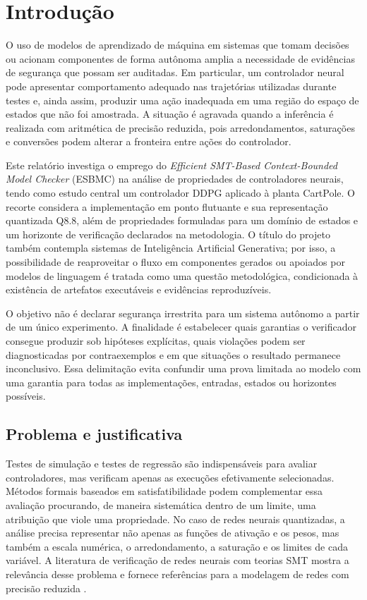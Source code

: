\chapter{Introdução}

O uso de modelos de aprendizado de máquina em sistemas que tomam decisões ou acionam componentes de forma autônoma amplia a necessidade de evidências de segurança que possam ser auditadas. Em particular, um controlador neural pode apresentar comportamento adequado nas trajetórias utilizadas durante testes e, ainda assim, produzir uma ação inadequada em uma região do espaço de estados que não foi amostrada. A situação é agravada quando a inferência é realizada com aritmética de precisão reduzida, pois arredondamentos, saturações e conversões podem alterar a fronteira entre ações do controlador.

Este relatório investiga o emprego do \textit{Efficient SMT-Based Context-Bounded Model Checker} (ESBMC) na análise de propriedades de controladores neurais, tendo como estudo central um controlador DDPG aplicado à planta CartPole. O recorte considera a implementação em ponto flutuante e sua representação quantizada Q8.8, além de propriedades formuladas para um domínio de estados e um horizonte de verificação declarados na metodologia. O título do projeto também contempla sistemas de Inteligência Artificial Generativa; por isso, a possibilidade de reaproveitar o fluxo em componentes gerados ou apoiados por modelos de linguagem é tratada como uma questão metodológica, condicionada à existência de artefatos executáveis e evidências reproduzíveis.

O objetivo não é declarar segurança irrestrita para um sistema autônomo a partir de um único experimento. A finalidade é estabelecer quais garantias o verificador consegue produzir sob hipóteses explícitas, quais violações podem ser diagnosticadas por contraexemplos e em que situações o resultado permanece inconclusivo. Essa delimitação evita confundir uma prova limitada ao modelo com uma garantia para todas as implementações, entradas, estados ou horizontes possíveis.

\section{Problema e justificativa}
Testes de simulação e testes de regressão são indispensáveis para avaliar controladores, mas verificam apenas as execuções efetivamente selecionadas. Métodos formais baseados em satisfatibilidade podem complementar essa avaliação procurando, de maneira sistemática dentro de um limite, uma atribuição que viole uma propriedade. No caso de redes neurais quantizadas, a análise precisa representar não apenas as funções de ativação e os pesos, mas também a escala numérica, o arredondamento, a saturação e os limites de cada variável. A literatura de verificação de redes neurais com teorias SMT mostra a relevância desse problema e fornece referências para a modelagem de redes com precisão reduzida \cite{sena2021verifying,song2022qnnverifier,huang2017robustness}.

